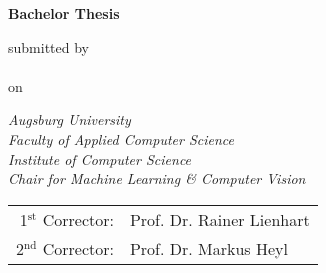 

\newcommand{\mail}{jonas.kell@student.uni-augsburg.de}



\begin{titlepage}
    
\color{dblue}

\begin{center}
    \vspace*{2cm}
    \Huge
    \textbf{\thetitle}

    \vspace*{1.5cm}
    \color{black}
    \textbf{Bachelor Thesis}

    \vspace*{1cm}
    \normalsize
    submitted by\\
    \LARGE
    \theauthor\\\vspace*{0.3cm}
    \normalsize
    on \thedate

    \vspace{1.8cm}
    \color{black}
    \emph{Augsburg University}\\
    \emph{Faculty of Applied Computer Science}\\
    \emph{Institute of Computer Science}\\
    \emph{Chair for Machine Learning \& Computer Vision}

    \vfill

    \begin{tabular}{rl}
        1$^\text{st}$ Corrector: &Prof. Dr. Rainer Lienhart\\
        2$^\text{nd}$ Corrector: &Prof. Dr. Markus Heyl\\
    \end{tabular}
\end{center}

\end{titlepage}
